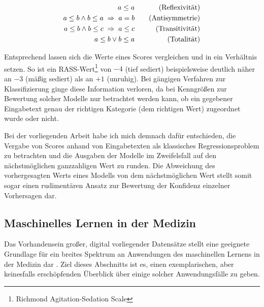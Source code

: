 \begin{equation*}
    \centering
    \begin{aligned}[c]
        a \leq a\\
        a \leq b \land b \leq a \; \Rightarrow \; a=b\\
        a \leq b \land b \leq c \; \Rightarrow \; a \leq c\\
        a \leq b \lor b \leq a
    \end{aligned}
    \qquad
    \begin{aligned}[c]
        \text{(Reflexivität)}\\
        \text{(Antisymmetrie)}\\
        \text{(Transitivität)}\\
        \text{(Totalität)}
    \end{aligned}
\end{equation*}

Entsprechend lassen sich die Werte eines Scores vergleichen und in ein Verhältnis setzen. So ist ein RASS-Wert\footnote{Richmond Agitation-Sedation Scale} von $-4$ (tief sediert) beispielsweise deutlich näher an $-3$ (mäßig sediert) als an $+1$ (unruhig). Bei gängigen Verfahren zur Klassifizierung ginge diese Information verloren, da bei Kenngrößen zur Bewertung solcher Modelle nur betrachtet werden kann, ob ein gegebener Eingabetext genau der richtigen Kategorie (dem richtigen Wert) zugeordnet wurde oder nicht. 

Bei der vorliegenden Arbeit habe ich mich demnach dafür entschieden, die Vergabe von Scores anhand von Eingabetexten als klassisches Regressionsproblem zu betrachten und die Ausgaben der Modelle im Zweifelsfall auf den nächstmöglichen ganzzahligen Wert zu runden. Die Abweichung des vorhergesagten Werts eines Modells von dem nächstmöglichen Wert stellt somit sogar einen rudimentären Ansatz zur Bewertung der Konfidenz einzelner Vorhersagen dar. %

\subsection{Maschinelles Lernen in der Medizin}
Das Vorhandensein großer, digital vorliegender Datensätze stellt eine geeignete Grundlage für ein breites Spektrum an Anwendungen des maschinellen Lernens in der Medizin dar \citep{chenHowDevelopMachine2019}. Ziel dieses Abschnitts ist es, einen exemplarischen, aber keinesfalls erschöpfenden Überblick über einige solcher Anwendungsfälle zu geben.

